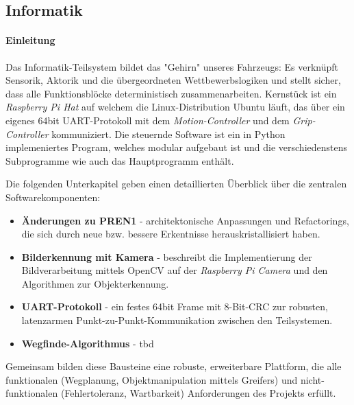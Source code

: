 \documentclass[main.tex]{subfiles} %
\begin{document}
\subsection{Informatik}

\paragraph{Einleitung}

Das Informatik-Teilsystem bildet das "Gehirn" unseres Fahrzeugs:
Es verknüpft Sensorik, Aktorik und die übergeordneten
Wettbewerbslogiken und stellt sicher, dass alle Funktionsblöcke
deterministisch zusammenarbeiten.
Kernstück ist ein \emph{Raspberry Pi Hat} auf welchem die
Linux-Distribution Ubuntu läuft, das über ein
eigenes 64bit UART-Protokoll mit dem \emph{Motion-Controller}
und dem \emph{Grip-Controller} kommuniziert.
Die steuernde Software ist ein in Python implemeniertes Program, welches modular
aufgebaut ist und die verschiedenstens Subprogramme wie auch das
Hauptprogramm enthält.

Die folgenden Unterkapitel geben einen detaillierten Überblick über
die zentralen Softwarekomponenten:

\begin{itemize}\setlength\itemsep{0.3em}
  \item \textbf{Änderungen zu PREN1} - architektonische Anpassungen
    und Refactorings, die sich durch neue bzw. bessere Erkentnisse
    herauskristallisiert haben.
  \item \textbf{Bilderkennung mit Kamera} - beschreibt die Implementierung
    der Bildverarbeitung mittels OpenCV auf der \emph{Raspberry Pi
    Camera} und den
    Algorithmen zur Objekterkennung.
  \item \textbf{UART-Protokoll} - ein festes 64bit Frame mit
    8-Bit-CRC zur robusten, latenzarmen Punkt-zu-Punkt-Kommunikation
    zwischen den Teilsystemen.
  \item \textbf{Wegfinde-Algorithmus} - tbd
\end{itemize}

Gemeinsam bilden diese Bausteine eine robuste, erweiterbare
Plattform, die alle funktionalen (Wegplanung, Objektmanipulation
mittels Greifers) und
nicht-funktionalen (Fehlertoleranz, Wartbarkeit)
Anforderungen des Projekts erfüllt.


\newpage


\newpage


\newpage


\newpage
\end{document}

